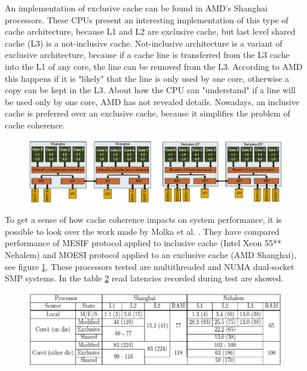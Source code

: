 An implementation of exclusive cache can be found in AMD's Shanghai processors.
These CPUs present an interesting implementation of this type of cache
architecture, because L1 and L2 are exclusive cache, but last level shared cache (L3) is a not-inclusive cache.
Not-inclusive architecture is a variant of exclusive architecture, because if a cache line is transferred from the L3 cache into the L1 of any core, the 
line can be removed from the L3. According to AMD this happens if it is "likely" that the line is only used by one core, otherwise a copy can be kept in 
the L3. About how the CPU can "understand" if a line will be used only by one core, AMD has not revealed details. Nowadays, an inclusive cache is 
preferred over an exclusive cache, because it simplifies the problem of cache coherence. 

\begin{figure}[htbp]
\centering
\includegraphics[width=\widefigure]{images/neh_amd.eps}
\caption{}
\label{fig:neh_amd}
\end{figure}

To get a sense of how cache coherence impacts on system performance, it is possible to look over the work made by 
Molka et al. \cite{molka}. They have compared performance of MESIF protocol applied to inclusive cache (Intel Xeon 55** Nehalem) and MOESI protocol applied 
to an exclusive cache (AMD Shanghai), see figure \ref{fig:neh_amd}. These processors tested are multithreaded and NUMA dual-socket SMP systems. 
In the table \ref{fig:tab_lat} read latencies recorded during test are showed.

\begin{figure}[htbp]
\centering
\includegraphics[width=\widefigure]{images/tab_lat.eps}
\caption{}
\label{fig:tab_lat}
\end{figure}

